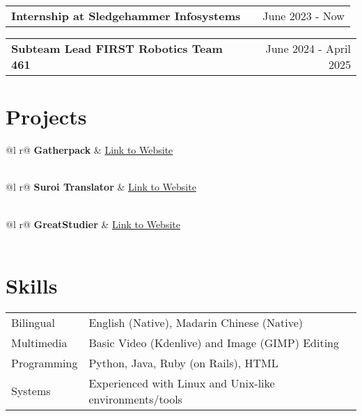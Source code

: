 \documentclass[letter, 12pt]{article}
\makeatletter
\newenvironment{jobshort}[2]
    {
    \begin{tabularx}{\linewidth}{@{}l X r@{}}
    \textbf{#1} & \hfill &  #2 \\[3.75pt]
    \end{tabularx}
    }
    {
    }
\makeatother
\begin{document}
\begin{jobshort}{Internship at Sledgehammer Infosystems}{June 2023 - Now}
\end{jobshort}

\begin{jobshort}{Subteam Lead FIRST Robotics Team 461}{June 2024 - April 2025}
\end{jobshort}

\section{Projects}

\begin{tabularx}{\linewidth}{ @{}l r@{} }
\textbf{Gatherpack} & \hfill \href{https://gatherpack.com}{Link to Website} \\[3.75pt]
  \\
\end{tabularx}

\begin{tabularx}{\linewidth}{ @{}l r@{} }
\textbf{Suroi Translator} & \hfill \href{https://github.com/HasangerGames/suroi}{Link to Website} \\[3.75pt]
  \\
\end{tabularx}

\begin{tabularx}{\linewidth}{ @{}l r@{} }
\textbf{GreatStudier} & \hfill \href{https://github.com/greatericontop/GreatStudier}{Link to Website} \\[3.75pt]
  \\
\end{tabularx}

\section{Skills}
\begin{tabularx}{\linewidth}{@{}l X@{}}
Bilingual &  English (Native), Madarin Chinese (Native) \\
Multimedia & Basic Video (Kdenlive) and Image (GIMP) Editing \\
Programming & Python, Java, Ruby (on Rails), HTML \\
Systems & Experienced with Linux and Unix-like environments/tools \\
\end{tabularx}

\vfill
{}
\end{document}
